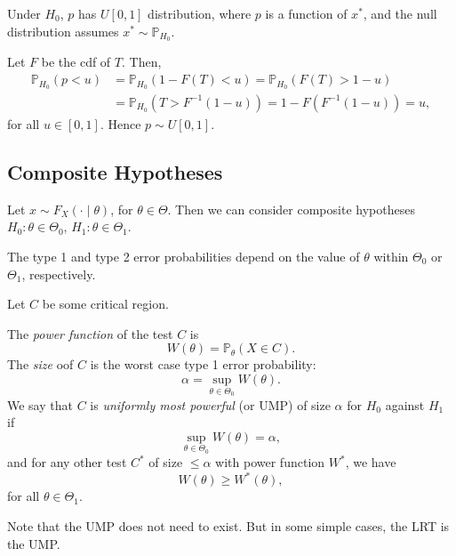 \documentclass[12pt]{article}
\begin{document}
\begin{proposition}
	Under $H_0$, $p$ has $U[0, 1]$ distribution, where $p$ is a function of $x^{\ast}$, and the null distribution assumes $x^{\ast} \sim \mathbb{P}_{H_0}$.
\end{proposition}

\begin{proofbox}
	Let $F$ be the cdf of $T$. Then,
	\begin{align*}
		\mathbb{P}_{H_0}(p < u) &= \mathbb{P}_{H_0}(1 - F(T) < u) = \mathbb{P}_{H_0}(F(T) > 1-u) \\
					&= \mathbb{P}_{H_0}(T > F^{-1}(1-u)) = 1 - F(F^{-1}(1-u)) = u,
	\end{align*}
	for all $u \in [0, 1]$. Hence $p \sim U[0,1]$.
\end{proofbox}

\subsection{Composite Hypotheses}
\label{sub:composite_hypotheses}

Let $x \sim F_X(\cdot \mid \theta)$, for $\theta \in \Theta$. Then we can consider composite hypotheses $H_0 : \theta \in \Theta_0$, $H_1 : \theta \in \Theta_1$.

The type 1 and type 2 error probabilities depend on the value of $\theta$ within $\Theta_0$ or $\Theta_1$, respectively.

Let $C$ be some critical region.

\begin{definition}
	The \emph{power function} of the test $C$ is
	\[
	W(\theta) = \mathbb{P}_{\theta}(X \in C)
	.\]
	The \emph{size} oof $C$ is the worst case type 1 error probability:
	\[
	\alpha = \sup_{\theta \in \Theta_0} W(\theta)
	.\]
	We say that $C$ is \emph{uniformly most powerful} (or UMP) of size $\alpha$ for $H_0$ against $H_1$ if
	\[
	\sup_{\theta \in \Theta_0} W(\theta) = \alpha
	,\]
	and for any other test $C^{\ast}$ of size $\leq \alpha$ with power function $W^{\ast}$, we have
	\[
	W(\theta) \geq W^{\ast}(\theta)
	,\]
	for all $\theta \in \Theta_1$.
\end{definition}

Note that the UMP does not need to exist. But in some simple cases, the LRT is the UMP.
\end{document}
